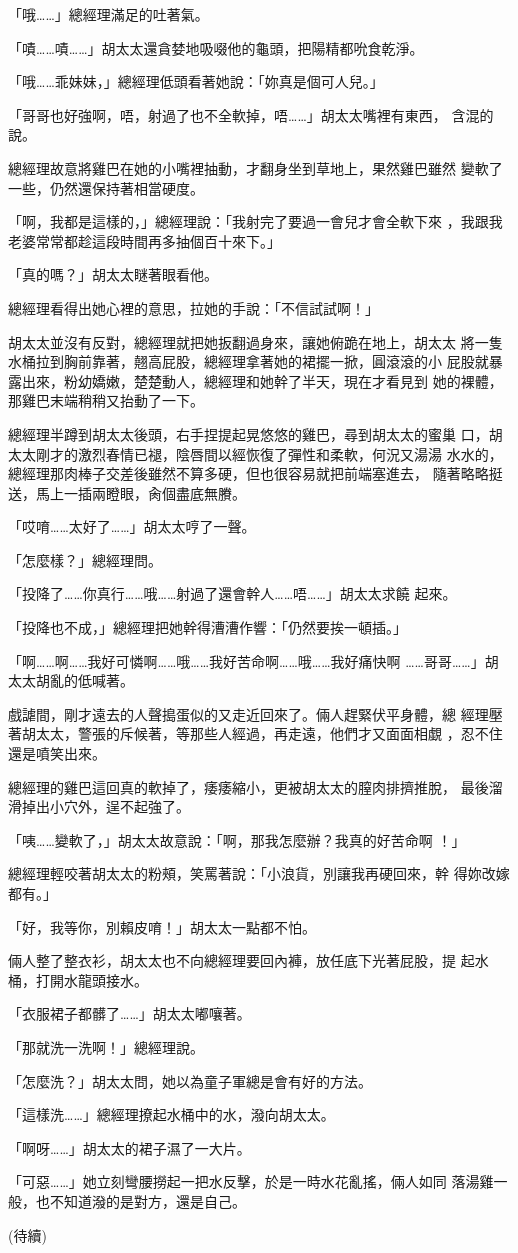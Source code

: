 「哦……」總經理滿足的吐著氣。

「嘖……嘖……」胡太太還貪婪地吸啜他的龜頭，把陽精都吮食乾淨。

「哦……乖妹妹，」總經理低頭看著她說：「妳真是個可人兒。」

「哥哥也好強啊，唔，射過了也不全軟掉，唔……」胡太太嘴裡有東西，
含混的說。

總經理故意將雞巴在她的小嘴裡抽動，才翻身坐到草地上，果然雞巴雖然
變軟了一些，仍然還保持著相當硬度。

「啊，我都是這樣的，」總經理說：「我射完了要過一會兒才會全軟下來
，我跟我老婆常常都趁這段時間再多抽個百十來下。」

「真的嗎？」胡太太瞇著眼看他。

總經理看得出她心裡的意思，拉她的手說：「不信試試啊！」

胡太太並沒有反對，總經理就把她扳翻過身來，讓她俯跪在地上，胡太太
將一隻水桶拉到胸前靠著，翹高屁股，總經理拿著她的裙擺一掀，圓滾滾的小
屁股就暴露出來，粉幼嬌嫩，楚楚動人，總經理和她幹了半天，現在才看見到
她的裸體，那雞巴末端稍稍又抬動了一下。

總經理半蹲到胡太太後頭，右手捏提起晃悠悠的雞巴，尋到胡太太的蜜巢
口，胡太太剛才的激烈春情已褪，陰唇間以經恢復了彈性和柔軟，何況又湯湯
水水的，總經理那肉棒子交差後雖然不算多硬，但也很容易就把前端塞進去，
隨著略略挺送，馬上一插兩瞪眼，肏個盡底無賸。

「哎唷……太好了……」胡太太哼了一聲。

「怎麼樣？」總經理問。

「投降了……你真行……哦……射過了還會幹人……唔……」胡太太求饒
起來。

「投降也不成，」總經理把她幹得漕漕作響：「仍然要挨一頓插。」

「啊……啊……我好可憐啊……哦……我好苦命啊……哦……我好痛快啊
……哥哥……」胡太太胡亂的低喊著。

戲謔間，剛才遠去的人聲搗蛋似的又走近回來了。倆人趕緊伏平身體，總
經理壓著胡太太，警張的斥候著，等那些人經過，再走遠，他們才又面面相覷
，忍不住還是噴笑出來。

總經理的雞巴這回真的軟掉了，痿痿縮小，更被胡太太的膣肉排擠推脫，
最後溜滑掉出小穴外，逞不起強了。

「咦……變軟了，」胡太太故意說：「啊，那我怎麼辦？我真的好苦命啊
！」

總經理輕咬著胡太太的粉頰，笑罵著說：「小浪貨，別讓我再硬回來，幹
得妳改嫁都有。」

「好，我等你，別賴皮唷！」胡太太一點都不怕。

倆人整了整衣衫，胡太太也不向總經理要回內褲，放任底下光著屁股，提
起水桶，打開水龍頭接水。

「衣服裙子都髒了……」胡太太嘟嚷著。

「那就洗一洗啊！」總經理說。

「怎麼洗？」胡太太問，她以為童子軍總是會有好的方法。

「這樣洗……」總經理撩起水桶中的水，潑向胡太太。

「啊呀……」胡太太的裙子濕了一大片。

「可惡……」她立刻彎腰撈起一把水反擊，於是一時水花亂搖，倆人如同
落湯雞一般，也不知道潑的是對方，還是自己。

(待續)










